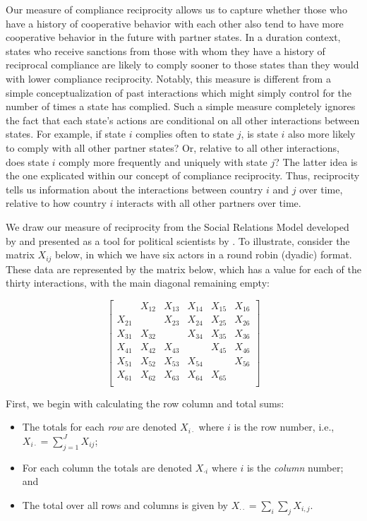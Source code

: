 Our measure of compliance reciprocity allows us to capture whether those who have a history of cooperative behavior with each other also tend to have more cooperative behavior in the future with partner states. In a duration context, states who receive sanctions from those with whom they have a history of reciprocal compliance are likely to comply sooner to those states than they would with lower compliance reciprocity. Notably, this measure is different from a simple conceptualization of past interactions which might simply control for the number of times a state has complied. Such a simple measure completely ignores the fact that each state's actions are conditional on all other interactions between states. For example, if state $i$ complies often to state $j$, is state $i$ also more likely to comply with all other partner states? Or, relative to all other interactions, does state $i$ comply more frequently and uniquely with state $j$? The latter idea is the one explicated within our  concept of compliance reciprocity. Thus, reciprocity tells us information about the interactions between country $i$ and $j$ over time, relative to how country $i$ interacts with all other partners over time. 

We draw our measure of reciprocity from the Social Relations Model developed by \citet{kenny1994interpersonal} and presented as a tool for political scientists by \cite{AnneAuthor}. To illustrate, consider the matrix $X_{ij}$ below, in which we have six actors in a round robin (dyadic) format. These data are represented by the matrix below, which has a value for each of the thirty interactions, with the main diagonal remaining empty:

\singlespacing
\[
\left[
\begin{array}{cccccc}
 & X_{12}  & X_{13}  & X_{14} & X_{15} & X_{16} \\
X_{21}  &  & X_{23}  & X_{24} & X_{25} & X_{26} \\
X_{31}  & X_{32}  &    & X_{34} & X_{35} & X_{36} \\
X_{41}  & X_{42}  & X_{43}  &  & X_{45} & X_{46} \\
X_{51}  & X_{52}  & X_{53}  & X_{54} &   & X_{56} \\
X_{61}  & X_{62}  & X_{63}  & X_{64} & X_{65} &   \\
\end{array}
\right]
\]

\doublespacing
First, we begin with calculating the row column and total sums:

\begin{itemize}
	\item The totals for each \emph{ row} are denoted $X_{i \cdot}$ where $i$ is the row number, i.e.,
	~\\
	$X_{i \cdot} = \sum_{j=1}^{J} X_{ij}$;
	\item For each column the totals are denoted
	 $X_{\cdot i}$ where $i$ is the \emph{column} number; and 
	 \item The total over all rows and columns is given by $X_{\cdot \cdot} = \sum_i \sum_j X_{i,j}$.
 \end{itemize}
 
